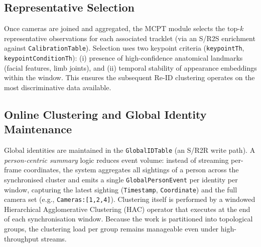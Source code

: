 \documentclass[5p,times]{elsarticle}
\begin{document}
\subsection{Representative Selection}
\label{sec:multi:repselect}

Once cameras are joined and aggregated, the MCPT module selects the top-$k$ representative observations for each associated tracklet (via an S/R2S enrichment against \texttt{CalibrationTable}). Selection uses two keypoint criteria (\texttt{keypointTh},\\ \texttt{keypointConditionTh}): (i) presence of high-confidence anatomical landmarks (facial features, limb joints), and (ii) temporal stability of appearance embeddings within the window. This ensures the subsequent Re-ID clustering operates on the most discriminative data available.

\subsection{Online Clustering and Global Identity Maintenance}
\label{sec:multi:globalid}
Global identities are maintained in the \texttt{GlobalIDTable} (an S/R2R write path). A \emph{person-centric summary} logic reduces event volume: instead of streaming per-frame coordinates, the system aggregates all sightings of a person across the synchronised cluster and emits a single \texttt{GlobalPersonEvent} per identity per window, capturing the latest sighting (\texttt{Timestamp}, \texttt{Coordinate}) and the full camera set (e.g., \texttt{Cameras:[1,2,4]}). Clustering itself is performed by a windowed Hierarchical Agglomerative Clustering (HAC) operator that executes at the end of each synchronisation window. Because the work is partitioned into topological groups, the clustering load per group remains manageable even under high-throughput streams.
\end{document}
